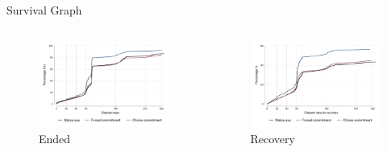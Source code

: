 \documentclass[8pt]{beamer}
\begin{document}
\begin{frame}{Survival Graph}
   \label{interpolation_censoring_imp}

\begin{columns}
\begin{column}{.45\textwidth}

\begin{figure}[H]
    \begin{center}
    \caption{Ended}
        \includegraphics[width=1.1\textwidth]{Figuras/survival_graph_ended.pdf}
    \end{center}
    \end{figure}

    
    \end{column}
 
    
\begin{column}{.45\textwidth}

\begin{figure}[H]
    \begin{center}
    \caption{Recovery}
        \includegraphics[width=1.1\textwidth]{Figuras/survival_graph_unpledge.pdf}
    \end{center}
    \end{figure}
 
    
    \end{column}    
    \end{columns}
\end{frame}
\end{document}

